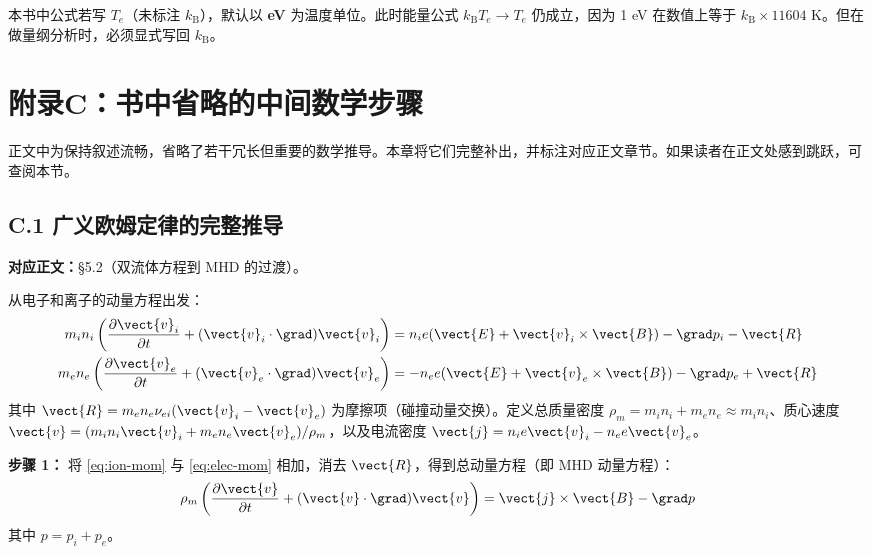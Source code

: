 \begin{warning}[温度单位的陷阱]
本书中公式若写 $T_e$（未标注 $k_\mathrm{B}$），默认以 \textbf{eV} 为温度单位。此时能量公式 $k_\mathrm{B}T_e\to T_e$ 仍成立，因为 1 eV 在数值上等于 $k_\mathrm{B}\times 11604$ K。但在做量纲分析时，必须显式写回 $k_\mathrm{B}$。
\end{warning}


\chapter*{附录C：书中省略的中间数学步骤}

正文中为保持叙述流畅，省略了若干冗长但重要的数学推导。本章将它们完整补出，并标注对应正文章节。如果读者在正文处感到跳跃，可查阅本节。


\section{C.1 广义欧姆定律的完整推导}
\label{sec:gen-ohm}

\textbf{对应正文：}\S 5.2（双流体方程到 MHD 的过渡）。

从电子和离子的动量方程出发：
\begin{align}
m_i n_i \left(\frac{\partial \vect{v}_i}{\partial t} + (\vect{v}_i\cdot\grad)\vect{v}_i\right) &= n_i e(\vect{E}+\vect{v}_i\times\vect{B}) - \grad p_i - \vect{R} \label{eq:ion-mom}\\
m_e n_e \left(\frac{\partial \vect{v}_e}{\partial t} + (\vect{v}_e\cdot\grad)\vect{v}_e\right) &= -n_e e(\vect{E}+\vect{v}_e\times\vect{B}) - \grad p_e + \vect{R} \label{eq:elec-mom}
\end{align}
其中 $\vect{R}=m_e n_e \nu_{ei}(\vect{v}_i-\vect{v}_e)$ 为摩擦项（碰撞动量交换）。定义总质量密度 $\rho_m=m_i n_i+m_e n_e\approx m_i n_i$、质心速度 $\vect{v}=(m_i n_i\vect{v}_i+m_e n_e\vect{v}_e)/\rho_m$，以及电流密度 $\vect{j}=n_i e\vect{v}_i-n_e e\vect{v}_e$。

\textbf{步骤 1：} 将 \eqref{eq:ion-mom} 与 \eqref{eq:elec-mom} 相加，消去 $\vect{R}$，得到总动量方程（即 MHD 动量方程）：
\begin{equation}
\rho_m \left(\frac{\partial \vect{v}}{\partial t} + (\vect{v}\cdot\grad)\vect{v}\right) = \vect{j}\times\vect{B} - \grad p
\end{equation}
其中 $p=p_i+p_e$。


